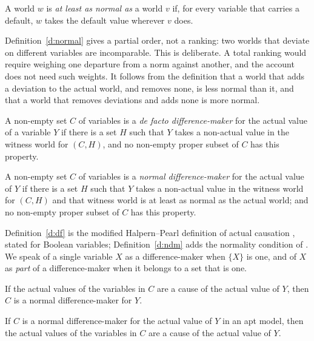 \documentclass{situationist-preprint}
\begin{document}
\begin{definition}\label{d:normal}
A world $w$ is \emph{at least as normal as} a world $v$ if, for every variable that carries a default, $w$ takes the default value wherever $v$ does.
\end{definition}

Definition~\ref{d:normal} gives a partial order, not a ranking: two worlds that deviate on different variables are incomparable. This is deliberate. A total ranking would require weighing one departure from a norm against another, and the account does not need such weights. It follows from the definition that a world that adds a deviation to the actual world, and removes none, is less normal than it, and that a world that removes deviations and adds none is more normal.

\begin{definition}\label{d:df}
A non-empty set $C$ of variables is a \emph{de facto difference-maker} for the actual value of a variable $Y$ if there is a set $H$ such that $Y$ takes a non-actual value in the witness world for $(C, H)$, and no non-empty proper subset of $C$ has this property.
\end{definition}

\begin{definition}\label{d:ndm}
A non-empty set $C$ of variables is a \emph{normal difference-maker} for the actual value of $Y$ if there is a set $H$ such that $Y$ takes a non-actual value in the witness world for $(C, H)$ and that witness world is at least as normal as the actual world; and no non-empty proper subset of $C$ has this property.
\end{definition}

Definition~\ref{d:df} is the modified Halpern--Pearl definition of actual causation \citep{Halpern2015}, stated for Boolean variables; Definition~\ref{d:ndm} adds the normality condition of \citet[\S 3.2]{Halpern2016}. We speak of a single variable $X$ as a difference-maker when $\{X\}$ is one, and of $X$ as \emph{part} of a difference-maker when it belongs to a set that is one.

\begin{principle}[Dependence]\label{p:dep}
If the actual values of the variables in $C$ are a cause of the actual value of $Y$, then $C$ is a normal difference-maker for $Y$.
\end{principle}

\begin{principle}[Default]\label{p:def}
If $C$ is a normal difference-maker for the actual value of $Y$ in an apt model, then the actual values of the variables in $C$ are a cause of the actual value of $Y$.
\end{principle}
\end{document}
